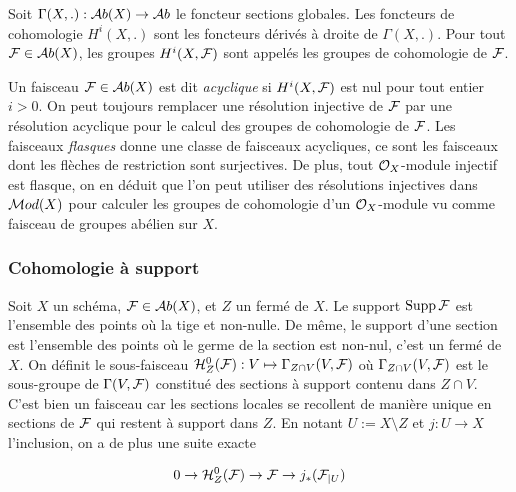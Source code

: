 \begin{defn}
Soit $\Gamma(X,.):\mathcal{A} b(X)\rightarrow \mathcal{A} b$ le foncteur sections globales. Les foncteurs de cohomologie $H^i(X,.)$ sont les foncteurs dérivés à droite de $\Gamma(X,.)$. Pour tout $\mathcal{F}\in \mathcal{A} b(X)$, les groupes $H^i(X,\mathcal{F})$ sont appelés les groupes de cohomologie de $\mathcal{F}$.
\end{defn}


Un faisceau $\mathcal{F}\in \mathcal{A} b(X)$ est dit \textit{acyclique} si $H^i(X,\mathcal{F})$ est nul pour tout entier $i>0$. On peut toujours remplacer une résolution injective de $\mathcal{F}$ par une résolution acyclique pour le calcul des groupes de cohomologie de $\mathcal{F}$. Les faisceaux \textit{flasques} donne une classe de faisceaux acycliques, ce sont les faisceaux dont les flèches de restriction sont surjectives. De plus, tout $\mathcal{O}_X$-module injectif est flasque, on en déduit que l'on peut utiliser des résolutions injectives dans $\mathcal{M} od(X)$ pour calculer les groupes de cohomologie d'un $\mathcal{O}_X$-module vu comme faisceau de groupes abélien sur $X$.

\subsubsection{Cohomologie à support}

Soit $X$ un schéma, $\mathcal{F}\in \mathcal{A} b(X)$, et $Z$ un fermé de $X$. Le support $\operatorname{Supp}\mathcal{F}$ est l'ensemble des points où la tige et non-nulle. De même, le support d'une section est l'ensemble des points où le germe de la section est non-nul, c'est un fermé de $X$. On définit le sous-faisceau $\mathcal{H} ^0 _Z(\mathcal{F}):V\mapsto \Gamma_{Z\cap V}(V,\mathcal{F})$ où $\Gamma_{Z\cap V}(V,\mathcal{F})$ est le sous-groupe de $\Gamma(V,\mathcal{F})$ constitué des sections à support contenu dans $Z\cap V$. C'est bien un faisceau car les sections locales se recollent de manière unique en sections de $\mathcal{F}$ qui restent à support dans $Z$. En notant $U:=X\setminus Z$ et $j:U\rightarrow X$ l'inclusion, on a de plus une suite exacte

\begin{equation}\label{eq:ESSupport}
0\rightarrow \mathcal{H}^0 _Z(\mathcal{F}) \rightarrow \mathcal{F} \rightarrow j_*(\mathcal{F}_{|U})
\end{equation}

